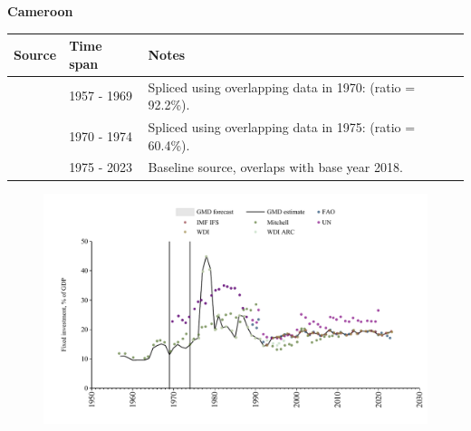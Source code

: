 \documentclass[12pt,a4paper,landscape]{article}
\begin{document}
\begin{adjustbox}{max totalsize={\paperwidth}{\paperheight},center}
\begin{minipage}[t][\textheight][t]{\textwidth}
\vspace*{0.5cm}
{}
\begin{center}
{\Large\bfseries Cameroon}
\end{center}
\vspace{0.5cm}
\begin{table}[H]
\centering
\small
\begin{tabular}{|l|l|l|}
\hline
\textbf{Source} & \textbf{Time span} & \textbf{Notes} \\
\hline
\rowcolor{white}\cite{Mitchell}& 1957 - 1969 &Spliced using overlapping data in 1970: (ratio = 92.2\%).\\
\rowcolor{lightgray}\cite{UN}& 1970 - 1974 &Spliced using overlapping data in 1975: (ratio = 60.4\%).\\
\rowcolor{white}\cite{WDI}& 1975 - 2023 &Baseline source, overlaps with base year 2018.\\
\hline
\end{tabular}
\end{table}
\begin{figure}[H]
\centering
\includegraphics[width=\textwidth,height=0.6\textheight,keepaspectratio]{graphs/CMR_finv_GDP.pdf}
\end{figure}
\end{minipage}
\end{adjustbox}
\end{document}
